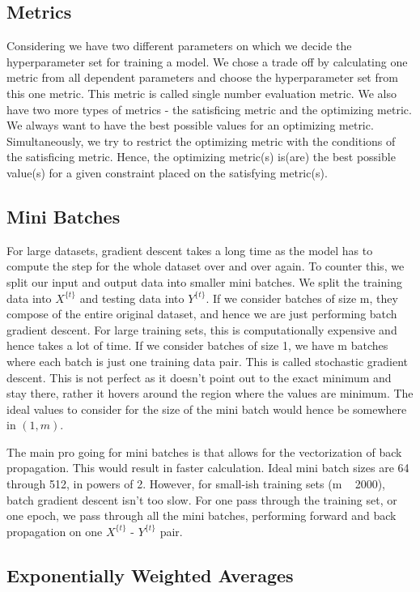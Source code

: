 \documentclass{article}
\begin{document}
\subsection{Metrics}
Considering we have two different parameters on which we decide the hyperparameter set for training a model. We chose a trade off by calculating one metric from all dependent parameters and choose the hyperparameter set from this one metric. This metric is called single number evaluation metric. We also have two more types of metrics - the satisficing metric and the optimizing metric. We always want to have the best possible values for an optimizing metric. Simultaneously, we try to restrict the optimizing metric with the conditions of the satisficing metric. Hence, the optimizing metric(s) is(are) the best possible value(s) for a given constraint placed on the satisfying metric(s).

\subsection{Mini Batches}

For large datasets, gradient descent takes a long time as the model has to compute the step for the whole dataset over and over again. To counter this, we split our input and output data into smaller mini batches. We split the training data into $X^{\{t\}}$ and testing data into $Y^{\{t\}}$. If we consider batches of size m, they compose of the entire original dataset, and hence we are just performing batch gradient descent. For large training sets, this is computationally expensive and hence takes a lot of time. If we consider batches of size 1, we have m batches where each batch is just one training data pair. This is called stochastic gradient descent. This is not perfect as it doesn't point out to the exact minimum and stay there, rather it hovers around the region where the values are minimum. The ideal values to consider for the size of the mini batch would hence be somewhere in $(1, m)$. 

The main pro going for mini batches is that allows for the vectorization of back propagation. This would result in faster calculation. Ideal mini batch sizes are 64 through 512, in powers of 2. However, for small-ish training sets (m ~ 2000), batch gradient descent isn't too slow. For one pass through the training set, or one epoch, we pass through all the mini batches, performing forward and back propagation on one $X^{\{t\}}$ - $Y^{\{t\}}$ pair.

\subsection{Exponentially Weighted Averages}
\end{document}
